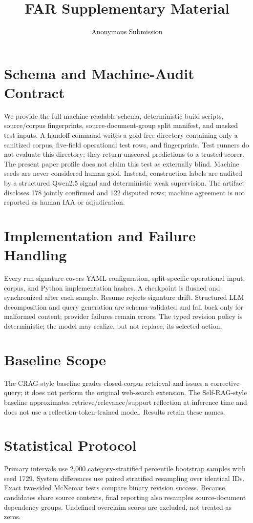 \documentclass[letterpaper]{article}
\title{FAR Supplementary Material}
\author{Anonymous Submission}
\begin{document}
\maketitle

\section{Schema and Machine-Audit Contract}
We provide the full machine-readable schema, deterministic build scripts,
source/corpus fingerprints, source-document-group split manifest, and masked
test inputs. A handoff command writes a gold-free directory containing only a
sanitized corpus, five-field operational test rows, and fingerprints. Test
runners do not evaluate this directory; they return unscored predictions to a
trusted scorer. The present paper profile does not claim this test as externally
blind. Machine seeds are never considered human gold. Instead, construction
labels are audited by a structured Qwen2.5 signal and deterministic weak
supervision. The artifact discloses 178 jointly confirmed and 122 disputed rows;
machine agreement is not reported as human IAA or adjudication.

\section{Implementation and Failure Handling}
Every run signature covers YAML configuration, split-specific operational
input, corpus, and Python implementation hashes. A checkpoint is flushed and
synchronized after each sample. Resume rejects signature drift. Structured LLM decomposition and query
generation are schema-validated and fall back only for malformed content;
provider failures remain errors. The typed revision policy is deterministic;
the model may realize, but not replace, its selected action.

\section{Baseline Scope}
The CRAG-style baseline grades closed-corpus retrieval and issues a corrective
query; it does not perform the original web-search extension. The Self-RAG-style
baseline approximates retrieve/relevance/support reflection at inference time
and does not use a reflection-token-trained model. Results retain these names.

\section{Statistical Protocol}
Primary intervals use 2,000 category-stratified percentile bootstrap samples
with seed 1729. System differences use paired stratified resampling over
identical IDs. Exact two-sided McNemar tests compare binary revision success.
Because candidates share source contexts, final reporting also resamples
source-document dependency groups. Undefined overclaim scores are excluded,
not treated as zeros.
\end{document}
